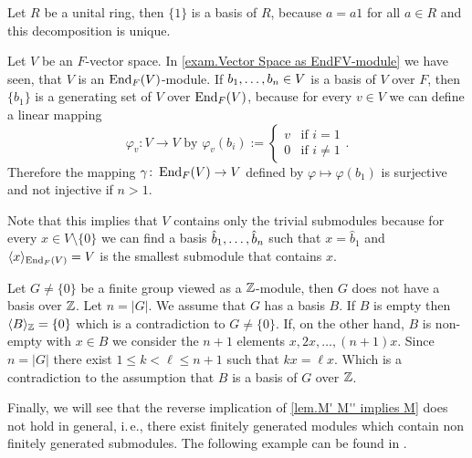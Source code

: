 \begin{exam}\label{exam.Bases of Modules}
\begin{exlist}
\item Let $R$ be a unital ring, then $\lbrace 1\rbrace$ is a basis of $R$, because $a=a1$ for all $a\in R$ and this decomposition is unique.
\item Let $V$ be an $F$-vector space. In \cref{exam.Vector Space as EndFV-module} we have seen, that $V$ is an $\operatorname{\mathrm{End}}_F(V)$-module. If $b_{1},\ldots,b_{n}\in V$ is a basis of $V$ over $F$, then $\lbrace b_1 \rbrace$ is a generating set of $V$ over $\operatorname{\mathrm{End}}_F(V)$, because for every $v\in V$ we can define a linear mapping 
\begin{equation*}
\varphi_v\colon V\to V \text{ by } \varphi_v(b_i):= \begin{cases}v & \text{if } i=1\\ 0 & \text{if } i\neq 1\end{cases}.
\end{equation*}
Therefore the mapping $\gamma\colon \operatorname{\mathrm{End}}_F(V)\to V$ defined by $\varphi\mapsto \varphi(b_1)$ is surjective and not injective if $n>1$.

Note that this implies that $V$ contains only the trivial submodules because for every $x\in V\setminus\lbrace 0\rbrace$ we can find a basis $\hat{b}_{1},\ldots,\hat{b}_{n}$ such that $x=\hat{b}_1$ and $\langle x\rangle_{\operatorname{\mathrm{End}}_F(V)}=V$ is the smallest submodule that contains $x$. \label{exam. Generating set of V over EndFV}
\item Let $G\neq\lbrace 0\rbrace$ be a finite group viewed as a $\operatorname{\mathbb{Z}}$-module, then $G$ does not have a basis over $\operatorname{\mathbb{Z}}$. Let $n=|G|$. We assume that $G$ has a basis $B$. If $B$ is empty then $\langle B\rangle_{\operatorname{\mathbb{Z}}} =\lbrace 0\rbrace$ which is a contradiction to $G\neq\lbrace 0\rbrace$. If, on the other hand, $B$ is non-empty with $x\in B$ we consider the $n+1$ elements $x,2x,\ldots,(n+1)x$. Since $n=| G|$ there exist $1\leq k<\ell\leq n+1$ such that $kx=\ell x$. Which is a contradiction to the assumption that $B$ is a basis of $G$ over $\operatorname{\mathbb{Z}}$.\label{exam.basis of G}
\end{exlist}
\end{exam}

Finally, we will see that the reverse implication of \cref{lem.M' M'' implies M} does not hold in general, i.\,e., there exist finitely generated modules which contain non finitely generated submodules. The following example can be found in \cite[p.197]{jantzen2005algebra}.

